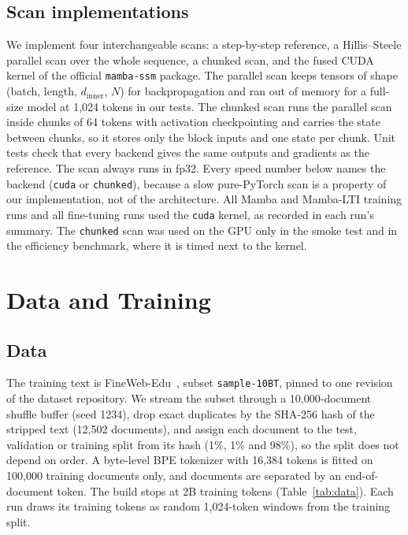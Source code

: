 \documentclass[conference]{IEEEtran}
\begin{document}
\subsection{Scan implementations}
We implement four interchangeable scans: a step-by-step reference, a Hillis--Steele parallel scan over
the whole sequence, a chunked scan, and the fused CUDA kernel of the official \texttt{mamba-ssm}
package. The parallel scan keeps tensors of shape (batch, length, $d_\text{inner}$, $N$) for
backpropagation and ran out of memory for a full-size model at 1,024 tokens in our tests. The chunked
scan runs the parallel scan inside chunks of 64 tokens with activation checkpointing and carries the
state between chunks, so it stores only the block inputs and one state per chunk. Unit tests check that
every backend gives the same outputs and gradients as the reference. The scan always runs in fp32.
Every speed number below names the backend (\texttt{cuda} or \texttt{chunked}), because a slow
pure-PyTorch scan is a property of our implementation, not of the architecture. All Mamba and
Mamba-LTI training runs and all fine-tuning runs used the \texttt{cuda} kernel, as recorded in each
run's summary. The \texttt{chunked} scan was used on the GPU only in the smoke test and in the
efficiency benchmark, where it is timed next to the kernel.

\section{Data and Training}

\subsection{Data}
The training text is FineWeb-Edu~\cite{penedo2024fineweb}, subset \texttt{sample-10BT}, pinned to one
revision of the dataset repository. We stream the subset through a 10,000-document shuffle buffer
(seed 1234), drop exact duplicates by the SHA-256 hash of the stripped text (12,502 documents), and
assign each document to the test, validation or training split from its hash (1\%, 1\% and 98\%), so
the split does not depend on order. A byte-level BPE tokenizer with 16,384 tokens is fitted on 100,000
training documents only, and documents are separated by an end-of-document token. The build stops at
2B training tokens (Table~\ref{tab:data}). Each run draws its training tokens as random 1,024-token
windows from the training split.
\end{document}
